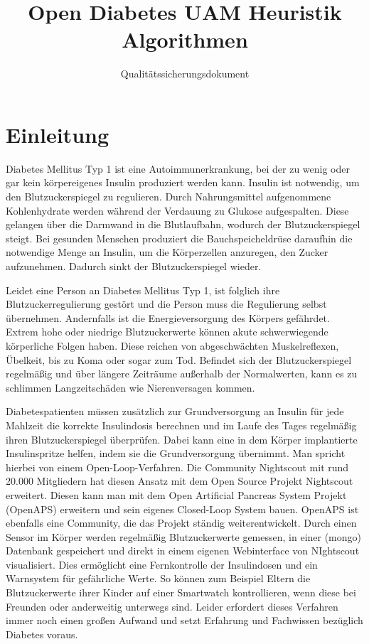 \documentclass[accentcolor=tud0b,12pt,paper=a4]{tudreport}
\title{Open Diabetes UAM Heuristik Algorithmen}
\subtitle{Qualitätssicherungsdokument}
\begin{document}
	\maketitle
	\tableofcontents 
	
	\chapter{Einleitung}
		Diabetes Mellitus Typ 1 ist eine Autoimmunerkrankung, bei der zu wenig oder gar kein körpereigenes Insulin produziert werden kann. Insulin ist notwendig, um den Blutzuckerspiegel zu regulieren. Durch Nahrungsmittel aufgenommene Kohlenhydrate werden während der Verdauung zu Glukose aufgespalten. Diese gelangen über die Darmwand in die Blutlaufbahn, wodurch der Blutzuckerspiegel steigt. Bei gesunden Menschen produziert die Bauchspeicheldrüse daraufhin die notwendige Menge an Insulin, um die Körperzellen anzuregen, den Zucker aufzunehmen. Dadurch sinkt der Blutzuckerspiegel wieder.
		
Leidet eine Person an Diabetes Mellitus Typ 1, ist folglich ihre Blutzuckerregulierung gestört und die Person muss die Regulierung selbst übernehmen. Andernfalls ist die Energieversorgung des Körpers gefährdet. Extrem hohe oder niedrige Blutzuckerwerte können akute schwerwiegende körperliche Folgen haben. Diese reichen von abgeschwächten Muskelreflexen, Übelkeit, bis zu Koma oder sogar zum Tod. Befindet sich der Blutzuckerspiegel regelmäßig und über längere Zeiträume außerhalb der Normalwerten, kann es zu schlimmen Langzeitschäden wie Nierenversagen kommen.

Diabetespatienten müssen zusätzlich zur Grundversorgung an Insulin für jede Mahlzeit die korrekte Insulindosis berechnen und im Laufe des Tages regelmäßig ihren Blutzuckerspiegel überprüfen. Dabei kann eine in dem Körper implantierte Insulinspritze helfen, indem sie die Grundversorgung übernimmt. Man spricht hierbei von einem Open-Loop-Verfahren. Die Community Nightscout mit rund 20.000 Mitgliedern hat diesen Ansatz mit dem Open Source Projekt Nightscout erweitert. Diesen kann man mit dem Open Artificial Pancreas System Projekt (OpenAPS) erweitern und sein eigenes Closed-Loop System bauen. OpenAPS ist ebenfalls eine Community, die das Projekt ständig weiterentwickelt. Durch einen Sensor im Körper werden regelmäßig Blutzuckerwerte gemessen, in einer (mongo) Datenbank gespeichert und direkt in einem eigenen Webinterface von NIghtscout visualisiert. Dies ermöglicht eine Fernkontrolle der Insulindosen und ein Warnsystem für gefährliche Werte. So können zum Beispiel Eltern die Blutzuckerwerte ihrer Kinder auf einer Smartwatch kontrollieren, wenn diese bei Freunden oder anderweitig unterwegs sind. Leider erfordert dieses Verfahren immer noch einen großen Aufwand und setzt Erfahrung und Fachwissen bezüglich Diabetes voraus. 
\end{document}

